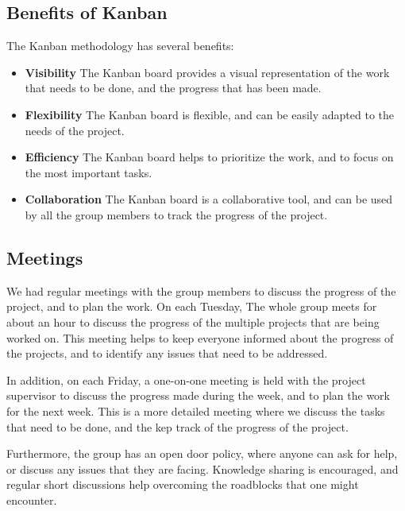\begin{spacing}{1.2}
    \subsection{Benefits of Kanban}
    The Kanban methodology has several benefits:
    \begin{itemize}
        \item \textbf{Visibility} The Kanban board provides a visual representation of the work
              that needs to be done, and the progress that has been made.
        \item \textbf{Flexibility} The Kanban board is flexible, and can be easily adapted to
              the needs of the project.
        \item \textbf{Efficiency} The Kanban board helps to prioritize the work, and to focus
              on the most important tasks.
        \item \textbf{Collaboration} The Kanban board is a collaborative tool, and can
              be used by all the group members to track the progress of the project.

    \end{itemize}

    \subsection{Meetings}
    We had regular meetings with the group members to discuss the progress of the project, and to plan the work.
    On each Tuesday, The whole group meets for about an hour to discuss the progress of the multiple projects that are being worked on.
    This meeting helps to keep everyone informed about the progress of the projects, and to identify any issues that need to be addressed.

    In addition, on each Friday, a one-on-one meeting is held with the project supervisor to discuss the progress made during the week,
    and to plan the work for the next week. This is a more detailed meeting where we discuss the tasks that need to be done, and the
    kep track of the progress of the project.

    Furthermore, the group has an open door policy, where anyone can ask for help, or discuss any issues that they are facing.
    Knowledge sharing is encouraged, and regular short discussions help overcoming the roadblocks that one might encounter.

\end{spacing}
